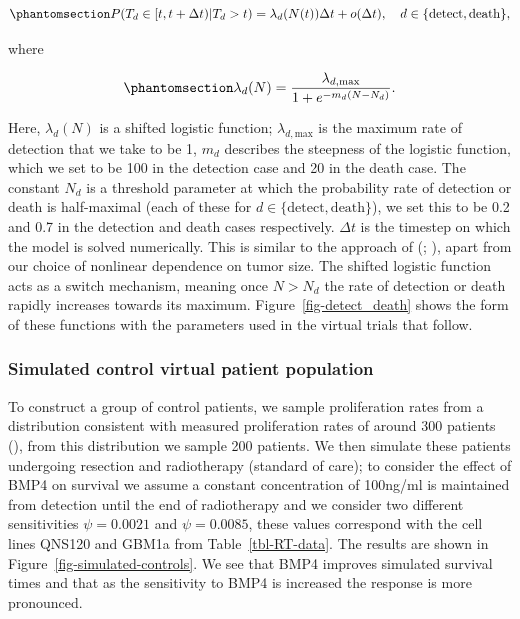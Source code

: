 \documentclass[
  letterpaper,
]{scrreprt}
\theoremstyle{definition}
\theoremstyle{remark}
\begin{document}
\begin{equation}\phantomsection\label{eq-detect_death_hazard}{
  P(T_d \in [t,t+\Delta t) | T_d>t) = \lambda_d (N(t)) \Delta t + o(\Delta t), \quad d \in \{\text{detect},\text{death}\},
}\end{equation}

where

\begin{equation}\phantomsection\label{eq-lambda_N}{
  \lambda_d (N) = \frac{\lambda_{d,\text{max}}}{1 + e^{-m_d(N - N_d)}}.
}\end{equation}

Here, \(\lambda_d(N)\) is a shifted logistic function;
\(\lambda_{d,\text{max}}\) is the maximum rate of detection that we take
to be 1, \(m_d\) describes the steepness of the logistic function, which
we set to be 100 in the detection case and 20 in the death case. The
constant \(N_d\) is a threshold parameter at which the probability rate
of detection or death is half-maximal (each of these for
\(d\in\{\text{detect},\text{death}\}\)), we set this to be 0.2 and 0.7
in the detection and death cases respectively. \(\Delta t\) is the
timestep on which the model is solved numerically. This is similar to
the approach of (; ), apart from
our choice of nonlinear dependence on tumor size. The shifted logistic
function acts as a switch mechanism, meaning once \(N > N_d\) the rate
of detection or death rapidly increases towards its maximum.
Figure~\ref{fig-detect_death} shows the form of these functions with the
parameters used in the virtual trials that follow.

\subsubsection{Simulated control virtual patient
population}\label{sec-simulation-controls}

To construct a group of control patients, we sample proliferation rates
from a distribution consistent with measured proliferation rates of
around 300 patients (), from
this distribution we sample 200 patients. We then simulate these
patients undergoing resection and radiotherapy (standard of care); to
consider the effect of BMP4 on survival we assume a constant
concentration of 100ng/ml is maintained from detection until the end of
radiotherapy and we consider two different sensitivities
\(\psi = 0.0021\) and \(\psi = 0.0085\), these values correspond with
the cell lines QNS120 and GBM1a from Table~\ref{tbl-RT-data}. The
results are shown in Figure~\ref{fig-simulated-controls}. We see that
BMP4 improves simulated survival times and that as the sensitivity to
BMP4 is increased the response is more pronounced.
\end{document}

